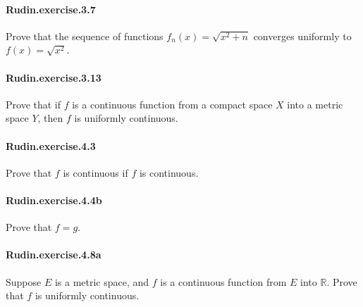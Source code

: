 \documentclass{article}
\begin{document}
\paragraph{Rudin.exercise.3.7} Prove that the sequence of functions $f_n(x) = \sqrt{x^2 + n}$ converges uniformly to $f(x) = \sqrt{x^2}$.

\paragraph{Rudin.exercise.3.13} Prove that if $f$ is a continuous function from a compact space $X$ into a metric space $Y$, then $f$ is uniformly continuous.



\paragraph{Rudin.exercise.4.3} Prove that $f$ is continuous if $f$ is continuous.

\paragraph{Rudin.exercise.4.4b} Prove that $f = g$.


\paragraph{Rudin.exercise.4.8a} Suppose $E$ is a metric space, and $f$ is a continuous function from $E$ into $\mathbb{R}$. Prove that $f$ is uniformly continuous.
\end{document}

